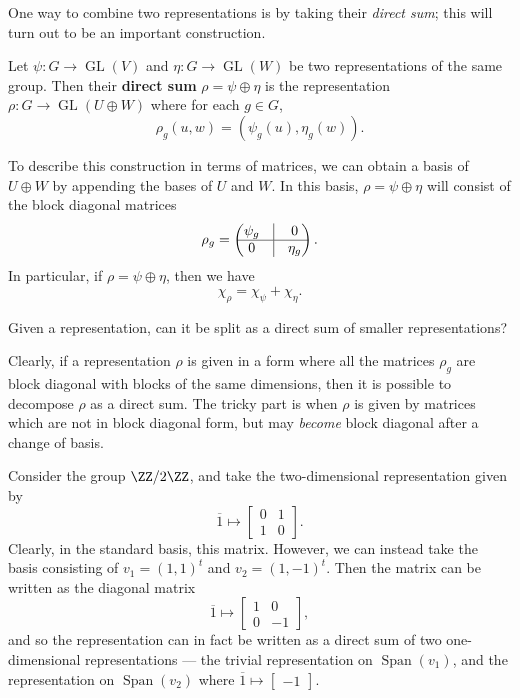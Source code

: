 One way to combine two representations is by taking their \emph{direct sum}; this will turn out to be an important construction. 


\begin{definition}
Let $\psi: G \to \operatorname{GL}(V)$ and $\eta: G \to \operatorname{GL}(W)$ be two representations of the same group. Then their \textbf{direct sum} $\rho = \psi \oplus \eta$ is the representation $\rho: G \to \operatorname{GL}(U \oplus W)$ where for each $g \in G$, \[\rho_g(u, w) = (\psi_g(u), \eta_g(w)).\] 
\end{definition}

To describe this construction in terms of matrices, we can obtain a basis of $U \oplus W$ by appending the bases of $U$ and $W$. In this basis, $\rho = \psi \oplus \eta$ will consist of the block diagonal matrices \[\rho_g = \begin{pmatrix}\psi_g & \vline & 0 \\ \hline 0 & \vline & \eta_g \end{pmatrix}.\] In particular, if $\rho = \psi \oplus \eta$, then we have \[\chi_\rho = \chi_{\psi} + \chi_\eta.\] 

\begin{qq}
Given a representation, can it be split as a direct sum of smaller representations?
\end{qq}

Clearly, if a representation $\rho$ is given in a form where all the matrices $\rho_g$ are block diagonal with blocks of the same dimensions, then it is possible to decompose $\rho$ as a direct sum. The tricky part is when $\rho$ is given by matrices which are not in block diagonal form, but may \emph{become} block diagonal after a change of basis.

\begin{example}\label{2d rep}
Consider the group $\ZZ/2\ZZ$, and take the two-dimensional representation given by \[\overline{1} \mapsto \begin{bmatrix} 0 & 1 \\ 1 & 0 \end{bmatrix}.\] Clearly, in the standard basis, this matrix. However, we can instead take the basis consisting of $v_1 = (1, 1)^t$ and $v_2 = (1, -1)^t$. Then the matrix can be written as the diagonal matrix 
\[\overline{1} \mapsto \begin{bmatrix}1 & 0 \\ 0 & -1 \end{bmatrix},\] and so the representation can in fact be written as a direct sum of two one-dimensional representations --- the trivial representation on $\operatorname{Span}(v_1)$, and the representation on $\operatorname{Span}(v_2)$ where $\overline{1} \mapsto \begin{bmatrix}-1 \end{bmatrix}$. 
\end{example}

